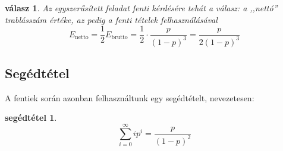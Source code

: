 \documentclass{article}
\newtheorem{lemm}{segédtétel}
\newtheorem{answer}{válasz}
\newcommand{\parenthesed}[1]{\left(#1\right)}
\newcommand{\expvalnet}{E_{\text{netto}}}
\newcommand{\expvalgro}{E_{\text{brutto}}}
\begin{document}
	\begin{answer}
		Az egyszerűsített feladat fenti kérdésére tehát a válasz: a ,,nettó'' trablásszám értéke, az pedig a fenti tételek felhasználásával
		\begin{equation}
			\expvalnet = \frac12\expvalgro = \frac12\cdot\frac p{\parenthesed{1-p}^3} = \frac p{2\parenthesed{1-p}^3}
		\end{equation}
	\end{answer}

	\subsection{Segédtétel}

	A fentiek során azonban felhasználtunk egy segédtételt, nevezetesen:
	\begin{lemm}
		\begin{equation}
			\sum_{i=0}^\infty ip^i = \frac p {\parenthesed{1-p}^2}
		\end{equation}
	\end{lemm}
\end{document}
